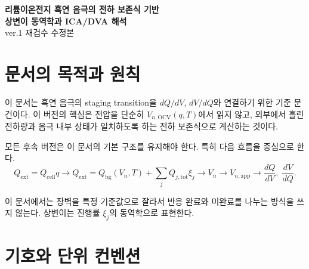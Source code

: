 \documentclass[11pt,a4paper]{article}
\newcommand{\OCV}{\mathrm{OCV}}
\newcommand{\app}{\mathrm{app}}
\newcommand{\bg}{\mathrm{bg}}
\newcommand{\cell}{\mathrm{cell}}
\newcommand{\ext}{\mathrm{ext}}
\newcommand{\tot}{\mathrm{tot}}
\begin{document}
\begin{center}
{\LARGE \textbf{리튬이온전지 흑연 음극의 전하 보존식 기반}}\\[0.25em]
{\LARGE \textbf{상변이 동역학과 ICA/DVA 해석}}\\[0.8em]
{\large ver.1 재검수 수정본}
\end{center}

\tableofcontents
\newpage

\section{문서의 목적과 원칙}
이 문서는 흑연 음극의 staging transition을 \(dQ/dV\), \(dV/dQ\)와 연결하기 위한 기준 문건이다. 이 버전의 핵심은 전압을 단순히 \(V_{n,\OCV}(q,T)\)에서 읽지 않고, 외부에서 흘린 전하량과 음극 내부 상태가 일치하도록 하는 전하 보존식으로 계산하는 것이다.

모든 후속 버전은 이 문서의 기본 구조를 유지해야 한다. 특히 다음 흐름을 중심으로 한다.
\begin{equation}
Q_{\ext}=Q_{\cell}q
\rightarrow
Q_{\ext}=Q_{\bg}(V_n,T)+\sum_jQ_{j,\tot}\xi_j
\rightarrow
V_n
\rightarrow
V_{n,\app}
\rightarrow
\frac{dQ}{dV},\;\frac{dV}{dQ}.
\end{equation}

\begin{mdframed}
이 문서에서는 장벽을 특정 기준값으로 잘라서 반응 완료와 미완료를 나누는 방식을 쓰지 않는다. 상변이는 진행률 \(\xi_j\)의 동역학으로 표현한다.
\end{mdframed}

\section{기호와 단위 컨벤션}
\end{document}
